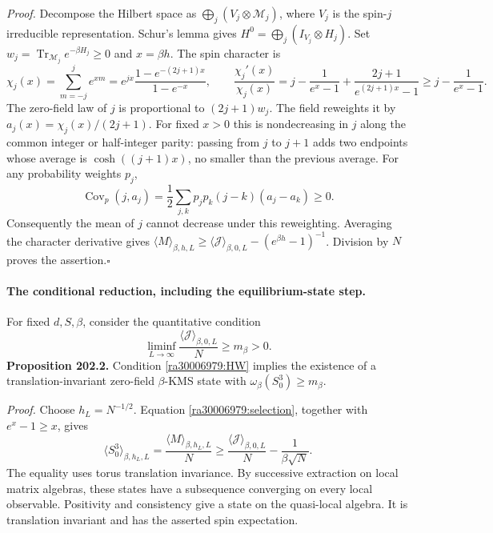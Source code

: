 \documentclass[11pt]{article}
\begin{document}
	\emph{Proof.}
	Decompose the Hilbert space as
	$\bigoplus_j(V_j\otimes\mathcal M_j)$, where $V_j$ is the spin-$j$
	irreducible representation. Schur's lemma gives
	$H^0=\bigoplus_j(I_{V_j}\otimes H_j)$. Set
	$w_j=\operatorname{Tr}_{\mathcal M_j}e^{-\beta H_j}\geq0$ and $x=\beta h$.
	The spin character is
	\[
	\chi_j(x)=\sum_{m=-j}^j e^{xm}
	=e^{jx}\frac{1-e^{-(2j+1)x}}{1-e^{-x}},
	\qquad
	\frac{\chi_j'(x)}{\chi_j(x)}
	=j-\frac1{e^x-1}+\frac{2j+1}{e^{(2j+1)x}-1}
	\geq j-\frac1{e^x-1}.
	\]
	The zero-field law of $j$ is proportional to $(2j+1)w_j$. The field
	reweights it by $a_j(x)=\chi_j(x)/(2j+1)$. For fixed $x>0$ this is
	nondecreasing in $j$ along the common integer or half-integer parity:
	passing from $j$ to $j+1$ adds two endpoints whose average is
	$\cosh((j+1)x)$, no smaller than the previous average. For any probability
	weights $p_j$,
	\[
	\operatorname{Cov}_p(j,a_j)
	=\frac12\sum_{j,k}p_jp_k(j-k)(a_j-a_k)\geq0.
	\]
	Consequently the mean of $j$ cannot decrease under this reweighting.
	Averaging the character derivative gives
	$\langle M\rangle_{\beta,h,L}\geq
	\langle\mathcal J\rangle_{\beta,0,L}-(e^{\beta h}-1)^{-1}$.
	Division by $N$ proves the assertion.\hfill$\square$
	
	\paragraph{The conditional reduction, including the equilibrium-state step.}
	For fixed $d,S,\beta$, consider the quantitative condition
	\begin{equation}\label{ra30006979:HW}
		\liminf_{L\to\infty}
		\frac{\langle\mathcal J\rangle_{\beta,0,L}}{N}
		\geq m_\beta>0. \tag{HW}
	\end{equation}
	\textbf{Proposition 202.2.} Condition \eqref{ra30006979:HW} implies the
	existence of a translation-invariant zero-field $\beta$-KMS state with
	$\omega_\beta(S_0^3)\geq m_\beta$.
	
	\emph{Proof.}
	Choose $h_L=N^{-1/2}$. Equation \eqref{ra30006979:selection}, together with
	$e^x-1\geq x$, gives
	\[
	\langle S_0^3\rangle_{\beta,h_L,L}
	=\frac{\langle M\rangle_{\beta,h_L,L}}{N}
	\geq\frac{\langle\mathcal J\rangle_{\beta,0,L}}{N}
	-\frac1{\beta\sqrt N}.
	\]
	The equality uses torus translation invariance. By successive extraction
	on local matrix algebras, these states have a subsequence converging on
	every local observable. Positivity and consistency give a state on the
	quasi-local algebra. It is translation invariant and has the asserted
	spin expectation.
	
\end{document}
